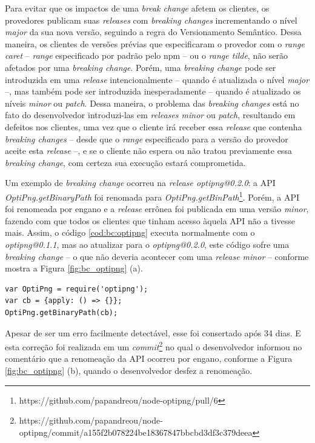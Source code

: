 Para evitar que os impactos de uma \textit{break change} afetem os clientes, os provedores publicam suas \textit{releases} com \textit{breaking changes} incrementando o nível \textit{major} da sua nova versão, seguindo a regra do Versionamento Semântico. Dessa maneira, os clientes de versões prévias que especificaram o provedor com o \textit{range caret} -- \textit{range} especificado por padrão pelo \gls{npm} -- ou o \textit{range tilde}, não serão afetados por uma \textit{breaking change}. Porém, uma \textit{breaking change} pode ser introduzida em uma \textit{release} intencionalmente -- quando é atualizada o nível \textit{major} --, mas também pode ser introduzida inesperadamente -- quando é atualizado os níveis \textit{minor} ou \textit{patch}. Dessa maneira, o problema das \textit{breaking changes} está no fato do desenvolvedor introduzi-las em \textit{releases minor} ou \textit{patch}, resultando em defeitos nos clientes, uma vez que o cliente irá receber essa \textit{release} que contenha \textit{breaking changes} -- desde que o \textit{range} especificado para a versão do provedor aceite esta \textit{release} --, e se o cliente não espera ou não tratou previamente essa \textit{breaking change}, com certeza sua execução estará comprometida.

Um exemplo de \textit{breaking change} ocorreu na \textit{release optipng@0.2.0}: a \gls{API} \textit{OptiPng.getBinaryPath} foi renomada para \textit{OptiPng.getBinPath}\footnote{https://github.com/papandreou/node-optipng/pull/6}. Porém, a \gls{API} foi renomeada por engano e a \textit{release} errônea foi publicada em uma versão \textit{minor}, fazendo com que todos os clientes que tinham acesso àquela \gls{API} não a tivesse mais. Assim, o código \ref{cod:bc:optipng} executa normalmente com o \textit{optipng@0.1.1}, mas ao atualizar para o \textit{optipng@0.2.0}, este código sofre uma \textit{breaking change} -- o que não deveria acontecer com uma \textit{release minor}  -- conforme mostra a Figura \ref{fig:bc_optipng} (a).

\begin{lstlisting}[style=Javascript, label=cod:bc:optipng, caption={Código que sofre \textit{breaking change} do \textit{optipng}}]
var OptiPng = require('optipng');
var cb = {apply: () => {}};
OptiPng.getBinaryPath(cb);
\end{lstlisting}

Apesar de ser um erro facilmente detectável, esse foi consertado após 34 dias. E esta correção foi realizada em um \textit{commit}\footnote{https://github.com/papandreou/node-optipng/commit/a155f2b078224be18367847bbcbd3df3c379deea} no qual o desenvolvedor informou no comentário que a renomeação da \gls{API} ocorreu por engano, conforme a Figura \ref{fig:bc_optipng} (b), quando o desenvolvedor desfez a renomeação.

